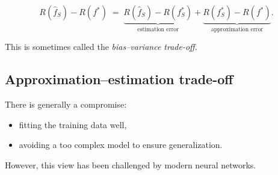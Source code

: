 \[
R(\hat f_S) - R(f^*) \;=\;
\underbrace{R(\hat f_S) - R(f^*_S)}_{\text{estimation error}}
+ \underbrace{R(f^*_S) - R(f^*)}_{\text{approximation error}}.
\]

This is sometimes called the \emph{bias--variance trade-off}.

\subsection*{Approximation--estimation trade-off}
There is generally a compromise:
\begin{itemize}
    \item fitting the training data well,
    \item avoiding a too complex model to ensure generalization.
\end{itemize}

\noindent However, this view has been challenged by modern neural networks.
